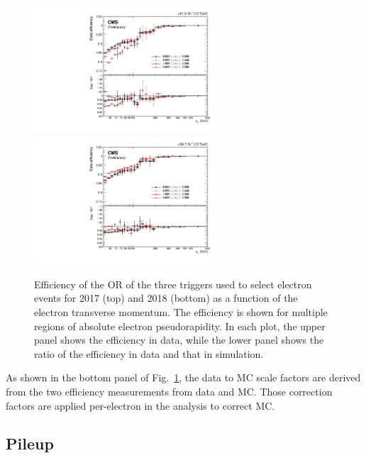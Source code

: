 \begin{figure}[hbtp]
    \begin{center}
    \includegraphics[width=0.6\textwidth]{Efficiency/Electron/electron_trig_eff_2017.pdf}
    \includegraphics[width=0.6\textwidth]{Efficiency/Electron/electron_trig_eff_2018.pdf}
    \caption{Efficiency of the OR of the three triggers used to select electron events for 2017 (top) and 2018 (bottom) as a function of the electron 
        transverse momentum. The efficiency is shown for multiple regions of absolute electron pseudorapidity. In each plot, the upper panel shows 
        the efficiency in data, while the lower panel shows the ratio of the efficiency in data and that in simulation.}
    \label{fig:hlteff_electron}
    \end{center}
\end{figure}

As shown in the bottom panel of Fig.~\ref{fig:hlteff_electron}, the data to MC scale factors are derived
from the two efficiency measurements from data and MC. Those correction factors are applied per-electron 
in the analysis to correct MC.

\subsection{Pileup}
\label{subsec:pu_reweighting}

